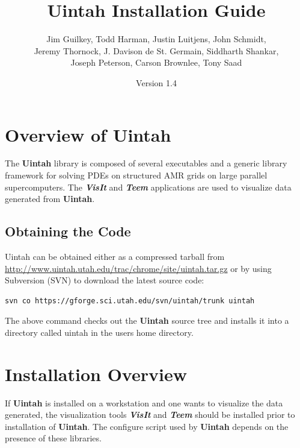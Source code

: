 \documentclass[12pt]{article}
\begin{document}
\title{Uintah Installation Guide}

\author{Jim Guilkey, Todd Harman, Justin Luitjens, John Schmidt,
  \\ Jeremy Thornock,
  J. Davison de St. Germain, Siddharth Shankar, \\
  Joseph Peterson,  
  Carson Brownlee,
  Tony Saad}

\date{Version 1.4}

\maketitle



\newpage

\tableofcontents

\newpage

\section{Overview of Uintah} \label{sec:overview}
The \textbf{Uintah} library is composed of several executables and a
generic library framework for solving PDEs on structured AMR grids on
large parallel supercomputers. The \textbf{\emph{VisIt}} and
\textbf{\emph{Teem}} applications are used to visualize data generated
from \textbf{Uintah}.

\subsection{Obtaining the Code}
Uintah can be obtained either as a compressed tarball from
\url{http://www.uintah.utah.edu/trac/chrome/site/uintah.tar.gz} or by using
Subversion (SVN) to download the latest source code:

\begin{verbatim}
svn co https://gforge.sci.utah.edu/svn/uintah/trunk uintah
\end{verbatim}

The above command checks out the \textbf{Uintah} source tree and
installs it into a directory called uintah in the users home
directory.


\section{Installation Overview}

If \textbf{Uintah} is installed on a workstation and one wants to
visualize the data generated, the visualization tools
\textbf{\emph{VisIt}} and \textbf{\emph{Teem}} should be installed
prior to installation of \textbf{Uintah}.  The configure script used by
\textbf{Uintah} depends on the presence of these libraries.
\end{document}
